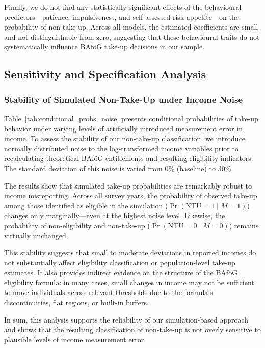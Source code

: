 Finally, we do not find any statistically significant effects of the behavioural predictors—patience, impulsiveness, and self-assessed risk appetite—on the probability of non-take-up. 
Across all models, the estimated coefficients are small and not distinguishable from zero, suggesting that these behavioural traits do not systematically influence BAföG take-up decisions in our sample.


\subsection{Sensitivity and Specification Analysis}
\subsubsection{Stability of Simulated Non-Take-Up under Income Noise}
Table~\ref{tab:conditional_probs_noise} presents conditional probabilities of take-up behavior under varying levels of artificially introduced measurement error in income. 
To assess the stability of our non-take-up classification, we introduce normally distributed noise to the log-transformed income variables prior to recalculating theoretical BAföG entitlements and resulting eligibility indicators. 
The standard deviation of this noise is varied from 0\% (baseline) to 30\%.



The results show that simulated take-up probabilities are remarkably robust to income misreporting. 
Across all survey years, the probability of observed take-up among those identified as eligible in the simulation (\( \Pr(\mathrm{NTU}=1 \mid M=1) \)) changes only marginally—even at the highest noise level. 
Likewise, the probability of non-eligibility and non-take-up (\( \Pr(\mathrm{NTU}=0 \mid M=0) \)) remains virtually unchanged.

This stability suggests that small to moderate deviations in reported incomes do not substantially affect eligibility classification or population-level take-up estimates. 
It also provides indirect evidence on the structure of the BAföG eligibility formula: in many cases, small changes in income may not be sufficient to move individuals across relevant thresholds due to the formula’s discontinuities, flat regions, or built-in buffers.

In sum, this analysis supports the reliability of our simulation-based approach and shows that the resulting classification of non-take-up is not overly sensitive to plausible levels of income measurement error.

